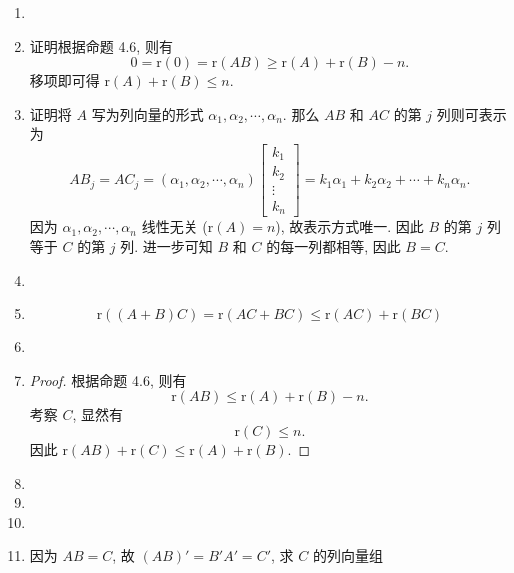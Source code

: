 \documentclass[a4paper, 11pt]{ctexart}
\newcommand{\rank}{\mathrm{r}}
\begin{document}
\begin{enumerate}
    \item %
    \item %
        {\heiti 证明}\quad 根据命题 4.6, 则有
        \[
            0 = \rank(0) = \rank(AB) \geqslant \rank(A) + \rank(B) - n.    
        \]
        移项即可得 $\rank(A) + \rank(B) \leqslant n$.
    \item %
        {\heiti 证明}\quad 将 $A$ 写为列向量的形式 $\alpha_1, \alpha_2, \cdots, \alpha_n$. 那么 $AB$ 和 $AC$ 的第 $j$ 列则可表示为
        \[
            AB_j = AC_j = (\alpha_1, \alpha_2, \cdots, \alpha_n)
            \begin{bmatrix}
                k_1 \\
                k_2 \\
                \vdots \\
                k_n
            \end{bmatrix}
            = k_1\alpha_1 + k_2\alpha_2 + \cdots + k_n\alpha_n.    
        \]
        因为 $\alpha_1, \alpha_2, \cdots, \alpha_n$ 线性无关 ($\rank(A) = n$), 故表示方式唯一. 因此 $B$ 的第 $j$ 列等于 $C$ 的第 $j$ 列.
        进一步可知 $B$ 和 $C$ 的每一列都相等, 因此 $B = C$.
    \item %
        
    \item %
        \[
            \rank((A+B)C) = \rank(AC + BC) \leqslant \rank(AC) + \rank(BC)    
        \]
    \item %
    \item %
        \begin{proof}
            根据命题 4.6, 则有
            \[
                \rank(AB) \leqslant \rank(A) + \rank(B) - n.    
            \]
            考察 $C$, 显然有
            \[
                \rank(C) \leqslant n.    
            \]
            因此 $\rank(AB) + \rank(C) \leqslant \rank(A) + \rank(B)$.
        \end{proof}
    \item %
    \item %
    \item %
    \item %
        因为 $AB = C$, 故 $(AB)' = B'A' = C'$, 求 $C$ 的列向量组
\end{enumerate}
\end{document}
